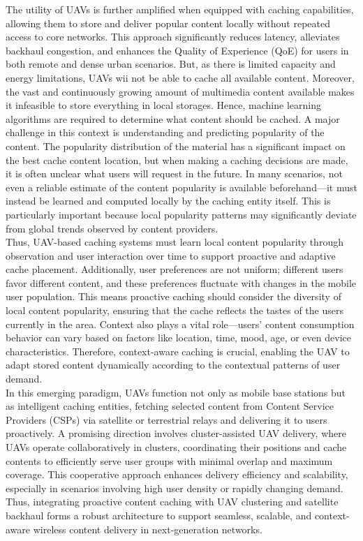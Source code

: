\documentclass[journal]{IEEEtran}
\begin{document}
The utility of UAVs is further amplified when equipped with caching capabilities, allowing them to store and deliver popular content locally without repeated access to core networks. This approach significantly reduces latency, alleviates backhaul congestion, and enhances the Quality of Experience (QoE) for users in both remote and dense urban scenarios. But, as there is  limited capacity and energy limitations, UAVs wii not be able to  cache all available content. Moreover, the vast and continuously growing amount of multimedia content available makes it infeasible to store everything in local storages. Hence, machine learning algorithms are required to determine what content should be cached. A major challenge in this context is understanding and predicting popularity of the content. The popularity distribution of the material has a significant impact on the best cache content location, but when making a caching decisions are made, it is often unclear what users will request in the future. In many scenarios, not even a reliable estimate of the content popularity is available beforehand—it must instead be learned and computed locally by the caching entity itself. This is particularly important because local popularity patterns may significantly deviate from global trends observed by content providers.\\
Thus, UAV-based caching systems must learn local content popularity through observation and user interaction over time to support proactive and adaptive cache placement. Additionally, user preferences are not uniform; different users favor different content, and these preferences fluctuate with changes in the mobile user population. This means proactive caching should consider the diversity of local content popularity, ensuring that the cache reflects the tastes of the users currently in the area. Context also plays a vital role—users’ content consumption behavior can vary based on factors like location, time, mood, age, or even device characteristics. Therefore, context-aware caching is crucial, enabling the UAV to adapt stored content dynamically according to the contextual patterns of user demand. \\
In this emerging paradigm, UAVs function not only as mobile base stations but as intelligent caching entities, fetching selected content from Content Service Providers (CSPs) via satellite or terrestrial relays and delivering it to users proactively. A promising direction involves cluster-assisted UAV delivery, where UAVs operate collaboratively in clusters, coordinating their positions and cache contents to efficiently serve user groups with minimal overlap and maximum coverage. This cooperative approach enhances delivery efficiency and scalability, especially in scenarios involving high user density or rapidly changing demand. Thus, integrating proactive content caching with UAV clustering and satellite backhaul forms a robust architecture to support seamless, scalable, and context-aware wireless content delivery in next-generation networks.
\end{document}
